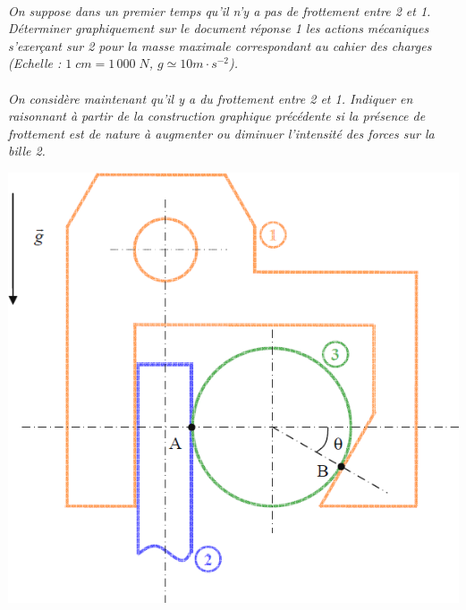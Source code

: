 \documentclass[11pt,oneside]{article}
\begin{document}
\paragraph{}
\textit{On suppose dans un premier temps qu'il n'y a pas de frottement entre 2 et 1. Déterminer graphiquement sur le document réponse 1 les actions mécaniques s'exerçant sur 2 pour la masse maximale correspondant au cahier des charges (Echelle : $1\;cm=1\,000\;N$, $g\simeq 10m\cdot s^{-2}$).}

\paragraph{}
\textit{On considère maintenant qu'il y a du frottement entre 2 et 1. Indiquer en raisonnant à partir de la construction graphique précédente si la présence de frottement est de nature à augmenter ou diminuer l'intensité des forces sur la bille 2.}

\begin{center}
\includegraphics[width=.7\textwidth]{png/img4.png}
\end{center}
\end{document}
